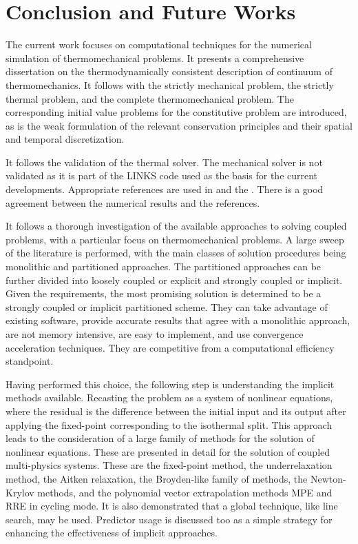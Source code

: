 \chapter{Conclusion and Future Works} \label{ch:conclusions}

The current work focuses on computational techniques for the numerical simulation of thermomechanical problems.
It presents a comprehensive dissertation on the thermodynamically consistent description of continuum of thermomechanics.
It follows with the strictly mechanical problem, the strictly thermal problem, and the complete thermomechanical problem.
The corresponding initial value problems for the constitutive problem are introduced, as is the weak formulation of the relevant conservation principles and their spatial and temporal discretization.

It follows the validation of the thermal solver.
The mechanical solver is not validated as it is part of the LINKS code used as the basis for the current developments.
Appropriate references are used in \cite{DINEN1991_1_2} and the \cite{NAFEMSbenchmarks}.
There is a good agreement between the numerical results and the references.

It follows a thorough investigation of the available approaches to solving coupled problems, with a particular focus on thermomechanical problems.
A large sweep of the literature is performed, with the main classes of solution procedures being monolithic and partitioned approaches.
The partitioned approaches can be further divided into loosely coupled or explicit and strongly coupled or implicit.
Given the requirements, the most promising solution is determined to be a strongly coupled or implicit partitioned scheme.
They can take advantage of existing software, provide accurate results that agree with a monolithic approach, are not memory intensive, are easy to implement, and use convergence acceleration techniques. They are competitive from a computational efficiency standpoint.

Having performed this choice, the following step is understanding the implicit methods available.
Recasting the problem as a system of nonlinear equations, where the residual is the difference between the initial input and its output after applying the fixed-point corresponding to the isothermal split.
This approach leads to the consideration of a large family of methods for the solution of nonlinear equations.
These are presented in detail for the solution of coupled multi-physics systems.
These are the fixed-point method, the underrelaxation method, the Aitken relaxation, the Broyden-like family of methods, the Newton-Krylov methods, and the polynomial vector extrapolation methods MPE and RRE in cycling mode.
It is also demonstrated that a global technique, like line search, may be used.
Predictor usage is discussed too as a simple strategy for enhancing the effectiveness of implicit approaches.

